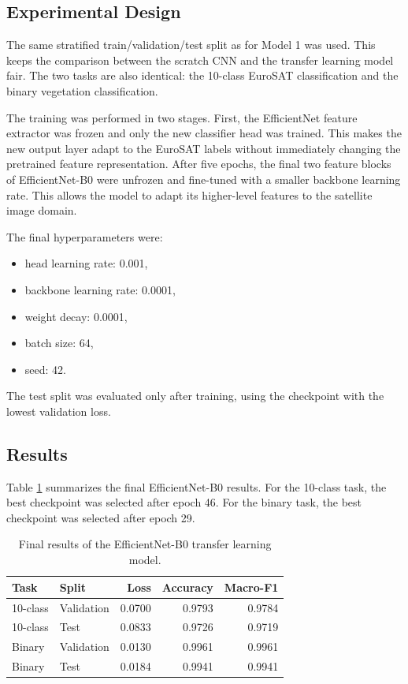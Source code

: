 \subsection{Experimental Design}

The same stratified train/validation/test split as for Model 1 was used. This
keeps the comparison between the scratch CNN and the transfer learning model
fair. The two tasks are also identical: the 10-class EuroSAT classification and
the binary vegetation classification.

The training was performed in two stages. First, the EfficientNet feature
extractor was frozen and only the new classifier head was trained. This makes
the new output layer adapt to the EuroSAT labels without immediately changing
the pretrained feature representation. After five epochs, the final two feature
blocks of EfficientNet-B0 were unfrozen and fine-tuned with a smaller backbone
learning rate. This allows the model to adapt its higher-level features to the
satellite image domain.

The final hyperparameters were:

\begin{itemize}
  \item head learning rate: 0.001,
  \item backbone learning rate: 0.0001,
  \item weight decay: 0.0001,
  \item batch size: 64,
  \item seed: 42.
\end{itemize}

The test split was evaluated only after training, using the checkpoint with the
lowest validation loss.

\subsection{Results}

Table \ref{tab:efficientnet_results} summarizes the final EfficientNet-B0
results. For the 10-class task, the best checkpoint was selected after epoch 46.
For the binary task, the best checkpoint was selected after epoch 29.

\begin{table}[H]
\centering
\caption{Final results of the EfficientNet-B0 transfer learning model.}
\label{tab:efficientnet_results}
\small
\begin{tabular}{llrrr}
\toprule
Task & Split & Loss & Accuracy & Macro-F1 \\
\midrule
10-class & Validation & 0.0700 & 0.9793 & 0.9784 \\
10-class & Test & 0.0833 & 0.9726 & 0.9719 \\
Binary & Validation & 0.0130 & 0.9961 & 0.9961 \\
Binary & Test & 0.0184 & 0.9941 & 0.9941 \\
\bottomrule
\end{tabular}
\end{table}

